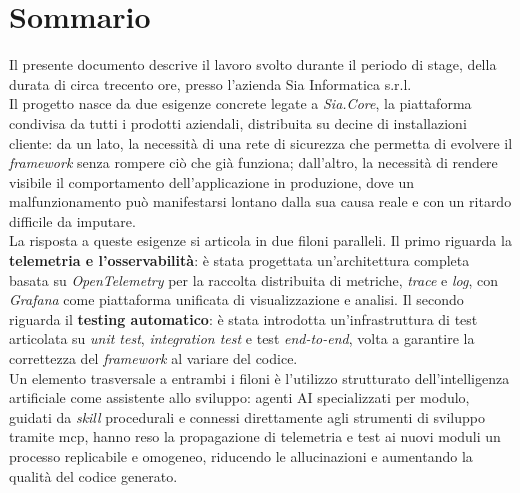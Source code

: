 \cleardoublepage
{}
{}
\begingroup
\let\clearpage\relax
\let\cleardoublepage\relax
\let\cleardoublepage\relax

\chapter*{Sommario}

Il presente documento descrive il lavoro svolto durante il periodo di stage, della durata di circa trecento ore, presso l'azienda Sia Informatica s.r.l.
\\
Il progetto nasce da due esigenze concrete legate a \emph{Sia.Core}, la piattaforma
condivisa da tutti i prodotti aziendali, distribuita su decine di installazioni
cliente: da un lato, la necessità di una rete di sicurezza che permetta di evolvere
il \emph{framework} senza rompere ciò che già funziona; dall'altro, la necessità di
rendere visibile il comportamento dell'applicazione in produzione, dove un
malfunzionamento può manifestarsi lontano dalla sua causa reale e con un ritardo
difficile da imputare.\\
La risposta a queste esigenze si articola in due filoni paralleli. Il primo riguarda
la \textbf{telemetria e l'osservabilità}: è stata progettata un'architettura completa
basata su \emph{OpenTelemetry} per la raccolta distribuita di metriche, \emph{trace}
e \emph{log}, con \emph{Grafana} come piattaforma unificata di visualizzazione e
analisi. Il secondo riguarda il \textbf{testing automatico}: è stata introdotta
un'infrastruttura di test articolata su \emph{unit test}, \emph{integration test}
e test \emph{end-to-end}, volta a garantire la correttezza del
\emph{framework} al variare del codice.\\
Un elemento trasversale a entrambi i filoni è l'utilizzo strutturato dell'intelligenza
artificiale come assistente allo sviluppo: agenti AI specializzati per modulo, guidati da
\emph{skill} procedurali e connessi direttamente agli strumenti di sviluppo tramite
\gls{mcp}, hanno reso la propagazione di telemetria
e test ai nuovi moduli un processo replicabile e omogeneo, riducendo le allucinazioni
e aumentando la qualità del codice generato.

\endgroup

\vfill

